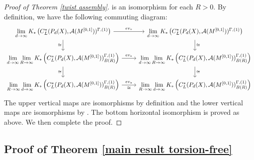\documentclass[11pt]{article}
\theoremstyle{definition}
\theoremstyle{plain}
\def\A{\mathcal A}\def\C{\mathcal C}\def\B{\mathcal B}\def\E{\mathcal E}\def\O{\mathcal O}\def\h{\mathfrak h}\def\K{\mathcal K}\def\F{\mathcal F}\def\P{\mathcal P}\def\L{\mathcal L}\def\R{\mathcal R}\def\Q{\mathcal Q}\def\H{\mathcal H}\def\S{\mathcal S}\def\N{\mathcal N}\def\U{\mathcal U}\def\V{\mathcal V}
\def\Ga{\Gamma}
\begin{document}
\begin{proof}[Proof of Theorem \ref{twist assembly}]
is an isomorphism for each $R>0$. By definition, we have the following commuting diagram:
$$\begin{tikzcd}
\lim\limits_{d\to\infty}K_*\left(C^*_L(P_d(X),\A(M^{[0,1]}))^{\Ga,(1)}\right) \arrow[r,"ev_*"] \arrow[d,"\cong"'] & 
\lim\limits_{d\to\infty}K_*\left(C^*_L(P_d(X),\A(M^{[0,1]}))^{\Ga,(1)}\right) \arrow[d,"\cong"] \\
\lim\limits_{d\to\infty}\lim\limits_{R\to\infty}K_*\left(C^*_L(P_d(X),\A(M^{[0,1]}))^{\Ga,(1)}_{B(R)}\right) \arrow[r,"ev_*"] \arrow[d,"\cong"'] & 
\lim\limits_{d\to\infty}\lim\limits_{R\to\infty}K_*\left(C^*_L(P_d(X),\A(M^{[0,1]}))^{\Ga,(1)}_{B(R)}\right) \arrow[d,"\cong"] \\
\lim\limits_{R\to\infty}\lim\limits_{d\to\infty}K_*\left(C^*_L(P_d(X),\A(M^{[0,1]}))^{\Ga,(1)}_{B(R)}\right) \arrow[r,"ev_*","\cong"']           & 
\lim\limits_{R\to\infty}\lim\limits_{d\to\infty}K_*\left(C^*_L(P_d(X),\A(M^{[0,1]}))^{\Ga,(1)}_{B(R)}\right)         
\end{tikzcd}$$
The upper vertical maps are isomorphisms by definition and the lower vertical maps are isomorphisms by \cite[Theorem 3.3]{SW2007}. The bottom horizontal isomorphism is proved as above. We then complete the proof.
\end{proof}























































\subsection*{Proof of Theorem \ref{main result torsion-free}}
\end{document}
